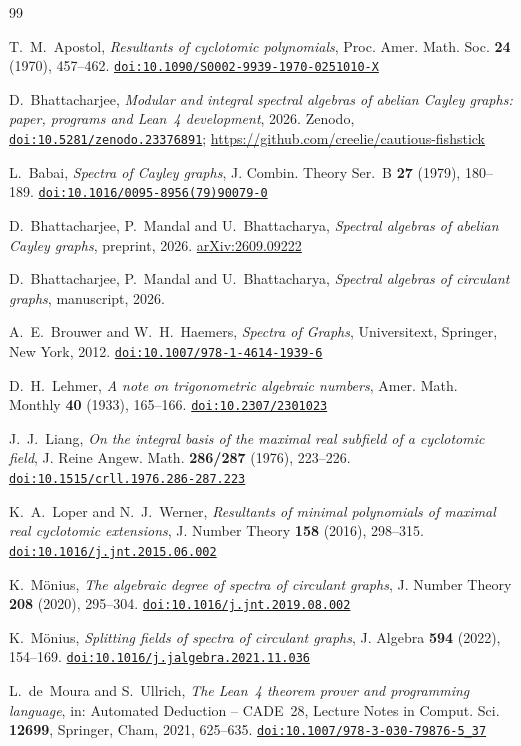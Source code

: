 \documentclass[11pt]{amsart}
\theoremstyle{definition}
\theoremstyle{remark}
\numberwithin{equation}{section}
\newcommand{\doi}[1]{\href{https://doi.org/#1}{\nolinkurl{doi:#1}}}
\begin{document}
\begin{thebibliography}{99}

T.~M.~Apostol, \emph{Resultants of cyclotomic polynomials}, Proc. Amer. Math. Soc. \textbf{24} (1970), 457--462. \doi{10.1090/S0002-9939-1970-0251010-X}

D.~Bhattacharjee, \emph{Modular and integral spectral algebras of abelian Cayley graphs: paper, programs and Lean~4 development}, 2026. Zenodo, \doi{10.5281/zenodo.23376891}; \url{https://github.com/creelie/cautious-fishstick}

L.~Babai, \emph{Spectra of Cayley graphs}, J. Combin. Theory Ser.~B \textbf{27} (1979), 180--189. \doi{10.1016/0095-8956(79)90079-0}

D.~Bhattacharjee, P.~Mandal and U.~Bhattacharya, \emph{Spectral algebras of abelian Cayley graphs}, preprint, 2026. \href{https://arxiv.org/abs/2609.09222}{arXiv:2609.09222}

D.~Bhattacharjee, P.~Mandal and U.~Bhattacharya, \emph{Spectral algebras of circulant graphs}, manuscript, 2026.

A.~E.~Brouwer and W.~H.~Haemers, \emph{Spectra of Graphs}, Universitext, Springer, New York, 2012. \doi{10.1007/978-1-4614-1939-6}

D.~H.~Lehmer, \emph{A note on trigonometric algebraic numbers}, Amer. Math. Monthly \textbf{40} (1933), 165--166. \doi{10.2307/2301023}

J.~J.~Liang, \emph{On the integral basis of the maximal real subfield of a cyclotomic field}, J. Reine Angew. Math. \textbf{286/287} (1976), 223--226. \doi{10.1515/crll.1976.286-287.223}

K.~A.~Loper and N.~J.~Werner, \emph{Resultants of minimal polynomials of maximal real cyclotomic extensions}, J. Number Theory \textbf{158} (2016), 298--315. \doi{10.1016/j.jnt.2015.06.002}

K.~Mönius, \emph{The algebraic degree of spectra of circulant graphs}, J. Number Theory \textbf{208} (2020), 295--304. \doi{10.1016/j.jnt.2019.08.002}

K.~Mönius, \emph{Splitting fields of spectra of circulant graphs}, J. Algebra \textbf{594} (2022), 154--169. \doi{10.1016/j.jalgebra.2021.11.036}

L.~de~Moura and S.~Ullrich, \emph{The Lean~4 theorem prover and programming language}, in: Automated Deduction -- CADE~28, Lecture Notes in Comput. Sci. \textbf{12699}, Springer, Cham, 2021, 625--635. \doi{10.1007/978-3-030-79876-5_37}


\end{thebibliography}
\end{document}
